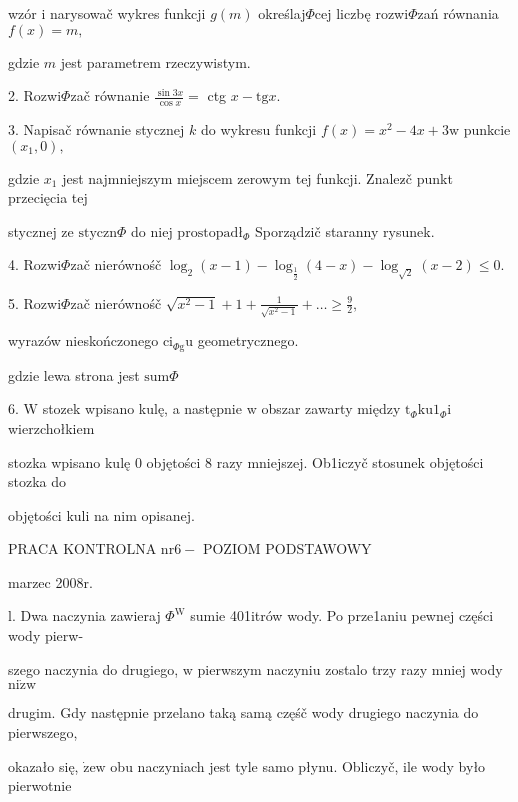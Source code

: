 \documentclass[a4paper,12pt]{article}
\begin{document}
wzór $\mathrm{i}$ narysowač wykres funkcji $g(m)$ określaj$\Phi$cej liczbę rozwi$\Phi$zań równania $f(x)=m,$

gdzie $m$ jest parametrem rzeczywistym.

2. Rozwi$\Phi$zač równanie $\displaystyle \frac{\sin 3x}{\cos x}=$ ctg $x-\mathrm{t}\mathrm{g}x.$

3. Napisač równanie stycznej $k$ do wykresu funkcji $f(x)=x^{2}-4x+3\mathrm{w}$ punkcie $(x_{1},0),$

gdzie $x_{1}$ jest najmniejszym miejscem zerowym tej funkcji. Znalez$\acute{}$č punkt przecięcia tej

stycznej ze $\mathrm{s}\mathrm{t}\mathrm{y}\mathrm{c}\mathrm{z}\mathrm{n}\Phi$ do niej $\mathrm{p}\mathrm{r}\mathrm{o}\mathrm{s}\mathrm{t}\mathrm{o}\mathrm{p}\mathrm{a}\mathrm{d}\text{ł}_{\Phi}$ Sporządzič staranny rysunek.

4. Rozwi$\Phi$zač nierównośč $\log_{2}(x-1)-\log_{\frac{1}{2}}(4-x)-\log_{\sqrt{2}}(x-2)\leq 0.$

5. Rozwi$\Phi$zač nierównośč $\displaystyle \sqrt{x^{2}-1}+1+\frac{1}{\sqrt{x^{2}-1}}+\ldots\geq \displaystyle \frac{9}{2},$

wyrazów nieskończonego $\mathrm{c}\mathrm{i}_{\Phi \mathrm{g}}\mathrm{u}$ geometrycznego.

gdzie lewa strona jest $\mathrm{s}\mathrm{u}\mathrm{m}\Phi$

6. $\mathrm{W}$ stozek wpisano kulę, a następnie $\mathrm{w}$ obszar zawarty między $\mathrm{t}_{\Phi}\mathrm{k}\mathrm{u}1_{\Phi}\mathrm{i}$ wierzchołkiem

stozka wpisano kulę $0$ objętości 8 razy mniejszej. Ob1iczyč stosunek objętości stozka do

objętości kuli na nim opisanej.





PRACA KONTROLNA $\mathrm{n}\mathrm{r}6-$ POZIOM PODSTAWOWY

marzec 2008r.

l. Dwa naczynia zawieraj $\Phi^{\mathrm{W}}$ sumie 401itrów wody. Po prze1aniu pewnej części wody pierw-

szego naczynia do drugiego, $\mathrm{w}$ pierwszym naczyniu zostalo trzy razy mniej wody $\mathrm{n}\mathrm{i}\dot{\mathrm{z}}\mathrm{w}$

drugim. Gdy następnie przelano taką samą częśč wody drugiego naczynia do pierwszego,

okazało się, $\dot{\mathrm{z}}\mathrm{e}\mathrm{w}$ obu naczyniach jest tyle samo płynu. Obliczyč, ile wody było pierwotnie
\end{document}
